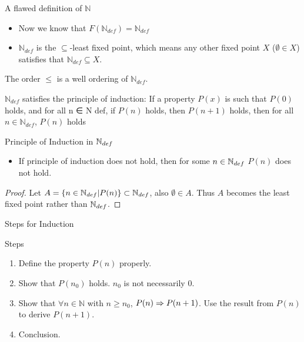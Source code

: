 \begin{frame}{A flawed definition of $\mathbb{N}$}
    \begin{itemize}
        \item Now we know that $F(\mathbb{N}_{def})=\mathbb{N}_{def}$
        \item $\mathbb{N}_{def}$ is the $\subseteq$-least fixed point, which means any other fixed point $X$ ($\emptyset \in X$) satisfies that $\mathbb{N}_{def}\subseteq X$.
    \end{itemize}
    \begin{theorem}
        The order $\leq$ is a well ordering of $\mathbb{N}_{def}$.
    \end{theorem}
    
    \begin{theorem}
        $\mathbb{N}_{def}$ satisfies the principle of induction: If a property $P(x)$ is such that $P(0)$ holds, and for all n ∈ N def, if $P(n)$ holds, then $P(n+1)$ holds, then for all $n \in\mathbb{N}_{def}$, $P(n)$ holds
    \end{theorem}

\end{frame}

\begin{frame}{Principle of Induction in $\mathbb{N}_{def}$}
    \begin{itemize}
        \item If principle of induction does not hold, then for some $n\in\mathbb{N}_{def}$ $P(n)$ does not hold.
    \end{itemize}
    \begin{proof}
        Let $A=\{n\in\mathbb{N}_{def}|P(n)\}\subset \mathbb{N}_{def}$, also $\emptyset\in A$. Thus $A$ becomes the least fixed point rather than $\mathbb{N}_{def}$. 
    \end{proof}
\end{frame}

\begin{frame}{Steps for Induction}
    \begin{block}{Steps}
    \begin{enumerate}
        \item Define the property $P(n)$ properly.
        \item Show that $P(n_0)$ holds. $n_0$ is not necessarily $0$.
        \item Show that $\forall n\in\mathbb{N}$ with $n\geq n_0$, $P(n)\Rightarrow P(n+1)$. Use the result from $P(n)$ to derive $P(n+1)$.
        \item Conclusion.
    \end{enumerate}
    \end{block}
\end{frame}

